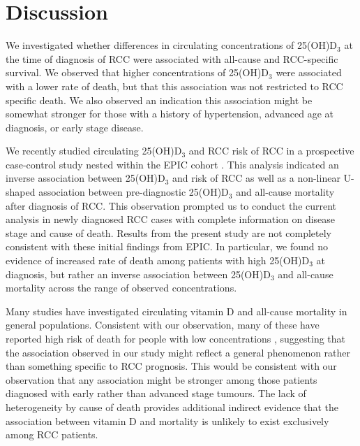 \documentclass[a4paper,11pt]{article}
\renewcommand{\cite}{\citep}
\begin{document}
\section*{Discussion}
We investigated whether differences in circulating concentrations of 
25(OH)D$_3$ at the time of diagnosis of RCC were associated with all-cause and 
RCC-specific survival. We observed that higher concentrations of 25(OH)D$_3$ 
were associated with a lower rate of death, but that this association was not 
restricted to RCC specific death. We also observed an indication this 
association might be somewhat stronger for those with a 
history of hypertension, advanced age at diagnosis, or early stage disease.

We recently studied circulating 25(OH)D$_3$ and RCC risk of RCC in a prospective
case-control study nested within the EPIC cohort \cite{muller_circulating_2014}.
This analysis indicated an inverse association between 
25(OH)D$_3$ and risk of RCC as well as a non-linear U-shaped association 
between pre-diagnostic 25(OH)D$_3$ and all-cause mortality after diagnosis 
of RCC. This observation prompted us to conduct the current analysis in newly 
diagnosed RCC cases with complete information on disease stage 
and cause of death. Results from the present study are not completely 
consistent with these initial findings from EPIC. In particular, we found no 
evidence of increased rate of death among patients with high 25(OH)D$_3$ at 
diagnosis, but rather an inverse association between 25(OH)D$_3$ and all-cause 
mortality across the range of observed concentrations.

Many studies have investigated circulating vitamin D and all-cause 
mortality in general populations. Consistent with our observation, many of these
have reported high risk of death for people with low concentrations 
\cite{schottker_strong_2013, virtanen_association_2011, hutchinson_low_2010, 
szulc_serum_2009, semba_low_2009, pilz_vitamin_2009, 
melamed_ml_25-hydroxyvitamin_2008, jia_nutritional_2007}, suggesting that 
the association observed in our study might reflect a general phenomenon rather 
than something specific to RCC prognosis. This would be consistent with our 
observation that any association might be stronger among those patients 
diagnosed with early rather than advanced stage tumours. The lack of 
heterogeneity by cause of death provides additional indirect evidence that the 
association between vitamin D and mortality is unlikely to exist exclusively 
among RCC patients. 
\end{document}

